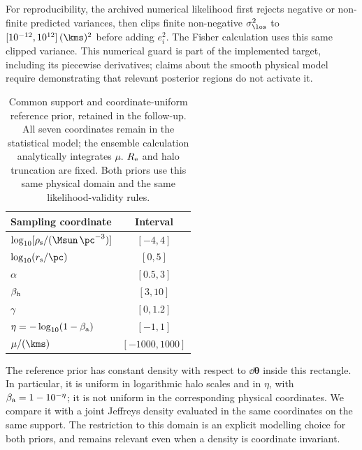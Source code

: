 For reproducibility, the archived numerical likelihood first rejects negative or non-finite predicted variances, then clips finite non-negative $\sigma_{\los}^2$ to $[10^{-12},10^{12}]\,(\kms)^2$ before adding $e_i^2$. The Fisher calculation uses this same clipped variance. This numerical guard is part of the implemented target, including its piecewise derivatives; claims about the smooth physical model require demonstrating that relevant posterior regions do not activate it.

\begin{table}
 \centering
 \caption{Common support and coordinate-uniform reference prior, retained in the follow-up. All seven coordinates remain in the statistical model; the ensemble calculation analytically integrates $\mu$. $R_{\rm e}$ and halo truncation are fixed. Both priors use this same physical domain and the same likelihood-validity rules.}
 \label{tab:prior}
 \begin{tabular}{lc}
  \toprule
  Sampling coordinate & Interval\\
  \midrule
  $\log_{10}[\rho_{\rm s}/(\Msun\,\pc^{-3})]$ & $[-4,4]$\\
  $\log_{10}(r_{\rm s}/\pc)$ & $[0,5]$\\
  $\alpha$ & $[0.5,3]$\\
  $\beta_{\rm h}$ & $[3,10]$\\
  $\gamma$ & $[0,1.2]$\\
  $\eta=-\log_{10}(1-\beta_{\rm a})$ & $[-1,1]$\\
  $\mu/(\kms)$ & $[-1000,1000]$\\
  \bottomrule
 \end{tabular}
\end{table}

The reference prior has constant density with respect to $\dd\boldsymbol{\theta}$ inside this rectangle. In particular, it is uniform in logarithmic halo scales and in $\eta$, with $\beta_{\rm a}=1-10^{-\eta}$; it is not uniform in the corresponding physical coordinates. We compare it with a joint Jeffreys density evaluated in the same coordinates on the same support. The restriction to this domain is an explicit modelling choice for both priors, and remains relevant even when a density is coordinate invariant.

